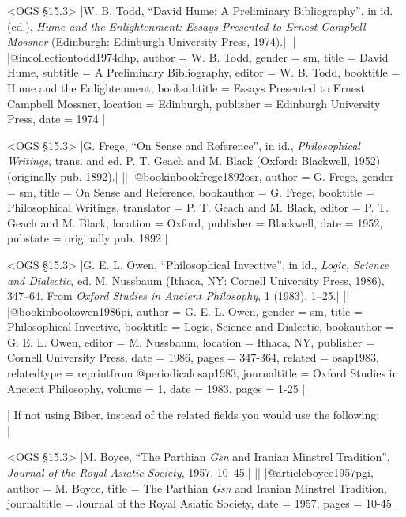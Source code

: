 \documentclass[extrafontsizes,11pt,a4paper,oneside]{memoir}
\begin{document}
\bibexample<OGS \S15.3>
|W. B. Todd, \enquote{David Hume: A Preliminary Bibliography}, in id. (ed.), \emph{Hume and the Enlightenment: Essays Presented to Ernest Campbell Mossner} (Edinburgh: Edinburgh University Press, 1974).|%
||%
|@incollection{todd1974dhp,
  author = {W. B. Todd},
  gender = {sm},
  title = {David Hume},
  subtitle = {A Preliminary Bibliography},
  editor = {W. B. Todd},
  booktitle = {Hume and the Enlightenment},
  booksubtitle = {Essays Presented to Ernest Campbell Mossner},
  location = {Edinburgh},
  publisher = {Edinburgh University Press},
  date = {1974}
}|

\bibexample<OGS \S15.3>
|G. Frege, \enquote{On Sense and Reference}, in id., \emph{Philosophical Writings}, trans. and ed. P. T. Geach and M. Black (Oxford: Blackwell, 1952) (originally pub. 1892).|%
||%
|@bookinbook{frege1892osr,
  author = {G. Frege},
  gender = {sm},
  title = {On Sense and Reference},
  bookauthor = {G. Frege},
  booktitle = {Philosophical Writings},
  translator = {P. T. Geach and M. Black},
  editor = {P. T. Geach and M. Black},
  location = {Oxford},
  publisher = {Blackwell},
  date = {1952},
  pubstate = {originally pub\adddotspace 1892}
}|

\bibexample<OGS \S15.3>
|G. E. L. Owen, \enquote{Philosophical Invective}, in id., \emph{Logic, Science and Dialectic}, ed. M. Nussbaum (Ithaca, NY: Cornell University Press, 1986), 347--64. From \emph{Oxford Studies in Ancient Philosophy}, 1 (1983), 1--25.|%
||%
|@bookinbook{owen1986pi,
  author = {G. E. L. Owen},
  gender = {sm},
  title = {Philosophical Invective},
  booktitle = {Logic, Science and Dialectic},
  bookauthor = {G. E. L. Owen},
  editor = {M. Nussbaum},
  location = {Ithaca, NY},
  publisher = {Cornell University Press},
  date = {1986},
  pages = {347-364},
  related = {osap1983},
  relatedtype = {reprintfrom}
}
@periodical{osap1983,
  journaltitle = {Oxford Studies in Ancient Philosophy},
  volume = {1},
  date = {1983},
  pages = {1-25}
}|

\todoc|
If not using Biber, instead of the related fields you would use the following:\\
|


\bibexample<OGS \S15.3>
|M. Boyce, \enquote{The Parthian \emph{Gsn} and Iranian Minstrel Tradition}, \emph{Journal of the Royal Asiatic Society}, 1957, 10--45.|%
||%
|@article{boyce1957pgi,
  author = {M. Boyce},
  title = {The Parthian \emph{Gsn} and Iranian Minstrel Tradition},
  journaltitle = {Journal of the Royal Asiatic Society},
  date = {1957},
  pages = {10-45}
}|
\end{document}
